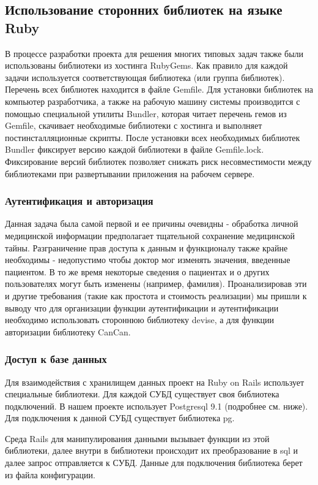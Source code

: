 \subsection{Использование сторонних библиотек на языке Ruby}
В процессе разработки проекта для решения многих типовых задач также были
использованы библиотеки из хостинга RubyGems. Как правило для каждой задачи
используется соответствующая библиотека (или группа библиотек). Перечень всех
библиотек находится в файле Gemfile. Для установки библиотек на компьютер
разработчика, а также на рабочую машину системы производится с помощью
специальной утилиты Bundler, которая читает перечень гемов из Gemfile, скачивает
необходимые библиотеки с хостинга и выполняет постинсталляционные скрипты. После
установки всех необходимых библиотек Bundler фиксирует версию каждой библиотеки
в файле Gemfile.lock. Фиксирование версий библиотек позволяет снижать риск
несовместимости между библиотеками при развертывании приложения на рабочем
сервере.

\subsubsection{Аутентификация и авторизация}
Данная задача была самой первой и ее причины очевидны - обработка личной
медицинской информации предполагает тщательной сохранение медицинской тайны.
Разграничение прав доступа к данным и функционалу также крайне необходимы -
недопустимо чтобы доктор мог изменять значения, введенные пациентом. В то же
время некоторые сведения о пациентах и о других пользователях могут быть
изменены (например, фамилия).
Проанализировав эти и другие требования (такие как простота и стоимость
реализации) мы пришли к выводу что для организации функции аутентификации и
аутентификации необходимо использовать стороннюю библиотеку devise, а для
функции авторизации библиотеку CanCan.

\subsubsection{Доступ к базе данных}
Для взаимодействия с хранилищем данных проект на Ruby on Rails использует
специальные библиотеки. Для каждой СУБД существует своя библиотека подключений.
В нашем проекте использует Postgresql 9.1 (подробнее см. ниже). Для подключения
к данной СУБД существует библиотека pg.
    
Среда Rails для манипулирования данными вызывает функции из этой библиотеки,
далее внутри в библиотеки происходит их преобразование в sql и далее запрос
отправляется к СУБД. Данные для подключения библиотека берет из файла
конфигурации.

